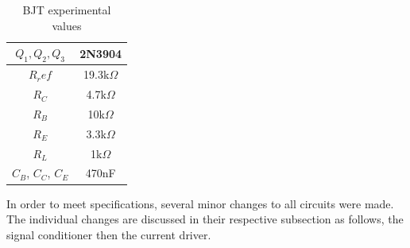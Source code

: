 \begin{table}[H]
	\centering
	\caption{BJT experimental values}
	\label{tab:bjtexp}
	\begin{tabular}{cc}
		$Q_1, Q_2, Q_3$ & 2N3904        \\ \hline
		$R_ref$         & 19.3k$\Omega$ \\ \hline
		$R_C$           & 4.7k$\Omega$  \\ \hline
		$R_B$           & 10k$\Omega$   \\ \hline 
		$R_E$           & 3.3k$\Omega$  \\ \hline 
		$R_L$           & 1k$\Omega$    \\ \hline
		$C_B$, $C_C$, $C_E$ & 470nF         \\ \hline
	\end{tabular}
\end{table}

In order to meet specifications, several minor changes to all circuits were made. The individual changes are discussed in their respective subsection as follows, the signal conditioner then the current driver.


%



